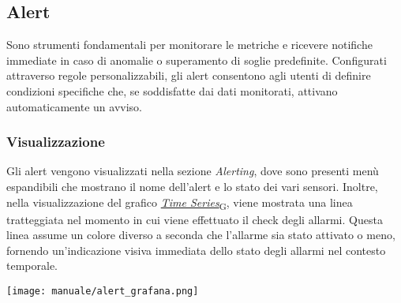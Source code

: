 
\subsection{Alert}
Sono strumenti fondamentali per monitorare le metriche e ricevere notifiche immediate in caso di anomalie o superamento di soglie predefinite. Configurati attraverso regole personalizzabili, gli alert consentono agli utenti di definire condizioni specifiche che, se soddisfatte dai dati monitorati, attivano automaticamente un avviso.
\subsubsection{Visualizzazione}
Gli alert vengono visualizzati nella sezione \textit{Alerting}, dove sono presenti menù espandibili che mostrano il nome dell'alert e lo stato dei vari sensori. Inoltre, nella visualizzazione del grafico \href{https://7last.github.io/docs/pb/documentazione-interna/glossario\#time-series}{\textit{Time Series}\textsubscript{G}}, viene mostrata una linea tratteggiata nel momento in cui viene effettuato il check degli allarmi. Questa linea assume un colore diverso a seconda che l'allarme sia stato attivato o meno, fornendo un'indicazione visiva immediata dello stato degli allarmi nel contesto temporale.

\begin{center}
    \texttt{[image: manuale/alert\_grafana.png]}
\end{center} 

